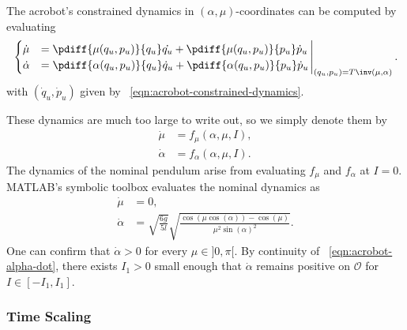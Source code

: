 The acrobot's constrained dynamics in
\((\alpha,\mu)\)-coordinates can be computed by evaluating
\begin{equation*}
\left.\begin{cases}
    \dot{\mu} &= \pdiff{\mu(q_u,p_u)}{q_u}\dot{q_u} +
         \pdiff{\mu(q_u,p_u)}{p_u}\dot{p}_u
    \\
    \dot{\alpha} &= \pdiff{\alpha(q_u,p_u)}{q_u}\dot{q}_u + 
        \pdiff{\alpha(q_u,p_u)}{p_u}\dot{p}_u
    \end{cases}\right|_{(q_u,p_u) = T\inv(\mu,\alpha)}
    .
\end{equation*}
with \((\dot{q}_u,\dot{p}_u)\) given by 
 ~\eqref{eqn:acrobot-constrained-dynamics}.

These dynamics are much too large to write out, so we simply denote them by
\begin{align}\label{eqn:acrobot-mu-dot}
    \dot{\mu} &= f_\mu(\alpha,\mu,I)
    ,\\
    \label{eqn:acrobot-alpha-dot}
    \dot{\alpha} &= f_\alpha(\alpha,\mu,I)
    .
\end{align}
The dynamics of the nominal pendulum arise from evaluating
\(f_\mu\) and \(f_\alpha\) at \(I = 0\).
MATLAB's symbolic toolbox evaluates the nominal dynamics as
\begin{align}\label{eqn:acrobot-mu-dot-nom}
    \dot{\mu} &= 0
    , \\
    \label{eqn:acrobot-alpha-dot-nom}
    \dot{\alpha} &= \sqrt{\frac{6g}{5l}} 
        \sqrt{\frac{\cos(\mu\cos(\alpha)) - \cos(\mu)}
            {\mu^2 \sin(\alpha)^2}}
    .
\end{align}
One can confirm that \(\dot{\alpha} > 0\) for every \(\mu \in ]0,\pi[\).
By continuity of ~\eqref{eqn:acrobot-alpha-dot}, there exists \(I_1 > 0\) small
enough that \(\dot{\alpha}\) remains positive on \(\mathcal{O}\) for 
\(I \in [-I_1,I_1]\).

\subsubsection*{Time Scaling}

